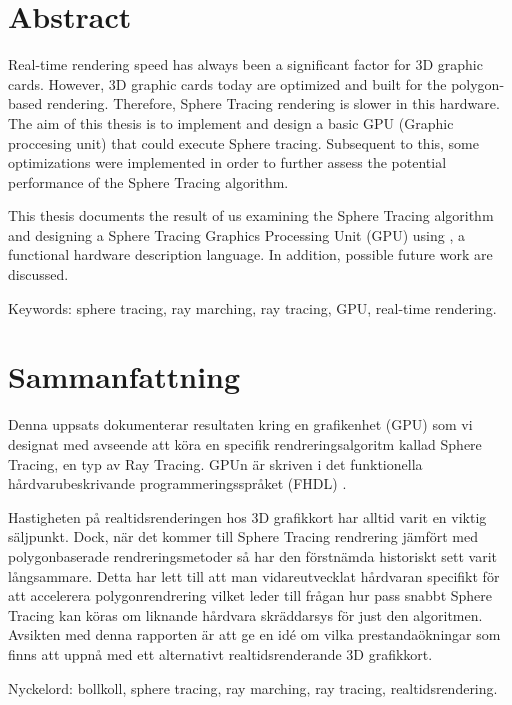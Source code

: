 \thispagestyle{plain}			%
\setlength{\parskip}{0pt plus 1.0pt}

\section*{Abstract}
	
	Real-time rendering speed has always been a significant factor for 3D
	graphic cards. However, 3D graphic cards today are optimized and built for
	the polygon-based rendering. Therefore, Sphere Tracing rendering is slower
	in this hardware. The aim of this thesis is to implement and design a
	basic GPU (Graphic proccesing unit) that could execute Sphere tracing.
	Subsequent to this, some optimizations were implemented in order to further
	assess the potential performance of the Sphere Tracing algorithm.
	
	This thesis documents the result of us examining the Sphere Tracing
	algorithm and designing a Sphere Tracing Graphics Processing Unit (GPU) using
	\clash, a functional hardware description language. In addition, possible
	future work are discussed.

	\vfill
	Keywords: sphere tracing, ray marching, ray tracing, GPU, real-time rendering.

\newpage
\thispagestyle{plain}

\section*{Sammanfattning}
	
	Denna uppsats dokumenterar resultaten kring en grafikenhet (GPU) som vi
	designat med avseende att köra en specifik rendreringsalgoritm kallad Sphere
	Tracing, en typ av Ray Tracing. GPUn är skriven i det funktionella
	hårdvarubeskrivande programmeringsspråket (FHDL) \clash.
	
	Hastigheten på realtidsrenderingen hos 3D grafikkort har alltid varit en
	viktig säljpunkt. Dock, när det kommer till Sphere Tracing rendrering jämfört
	med polygonbaserade rendreringsmetoder så har den förstnämda historiskt sett
	varit långsammare. Detta har lett till att man vidareutvecklat hårdvaran
	specifikt för att accelerera polygonrendrering vilket leder till frågan hur
	pass snabbt Sphere Tracing kan köras om liknande hårdvara skräddarsys för
	just den algoritmen. Avsikten med denna rapporten är att ge en idé om vilka
	prestandaökningar som finns att uppnå med ett alternativt realtidsrenderande
	3D grafikkort.
	
	\vfill
	Nyckelord: bollkoll, sphere tracing, ray marching, ray tracing, realtidsrendering.


\newpage
\thispagestyle{empty}
\mbox{}
